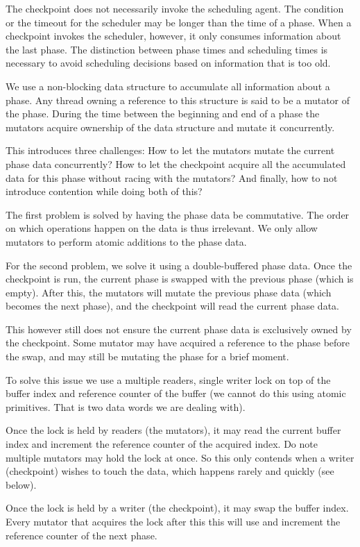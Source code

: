 The checkpoint does not necessarily invoke the scheduling agent. The condition or the timeout for the scheduler may be longer than the time of a phase. When a checkpoint invokes the scheduler, however, it only consumes information about the last phase. The distinction between phase times and scheduling times is necessary to avoid scheduling decisions based on information that is too old.

We use a non-blocking data structure to accumulate all information about a phase. Any thread owning a reference to this structure is said to be a mutator of the phase. During the time between the beginning and end of a phase the mutators acquire ownership of the data structure and mutate it concurrently.

This introduces three challenges: How to let the mutators mutate the current phase data concurrently? How to let the checkpoint acquire all the accumulated data for this phase without racing with the mutators? And finally, how to not introduce contention while doing both of this?

The first problem is solved by having the phase data be commutative. The order on which operations happen on the data is thus irrelevant. We only allow mutators to perform atomic additions to the phase data.

For the second problem, we solve it using a double-buffered phase data. Once the checkpoint is run, the current phase is swapped with the previous phase (which is empty). After this, the mutators will mutate the previous phase data (which becomes the next phase), and the checkpoint will read the current phase data.

This however still does not ensure the current phase data is exclusively owned by the checkpoint. Some mutator may have acquired a reference to the phase before the swap, and may still be mutating the phase for a brief moment.

To solve this issue we use a multiple readers, single writer lock on top of the buffer index and reference counter of the buffer (we cannot do this using atomic primitives. That is two data words we are dealing with).

Once the lock is held by readers (the mutators), it may read the current buffer index and increment the reference counter of the acquired index. Do note multiple mutators may hold the lock at once. So this only contends when a writer (checkpoint) wishes to touch the data, which happens rarely and quickly (see below).

Once the lock is held by a writer (the checkpoint), it may swap the buffer index. Every mutator that acquires the lock after this this will use and increment the reference counter of the next phase.

